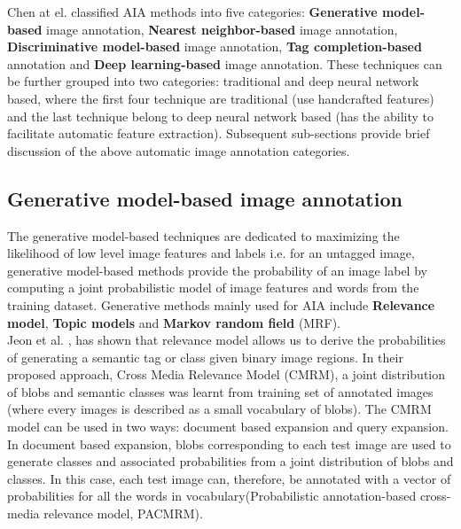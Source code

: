 \documentclass[conference]{IEEEtran}
\begin{document}
 	Chen at el. \cite{b2} classified AIA methods into five categories: \textbf{Generative model-based} image annotation, \textbf{Nearest neighbor-based}
image annotation, \textbf{Discriminative model-based} image annotation, \textbf{Tag completion-based}
annotation and \textbf{Deep learning-based} image annotation. These techniques can be further
grouped into two categories: traditional and deep neural network based, where the first
four technique are traditional (use handcrafted features) and the last technique belong to
deep neural network based (has the ability to facilitate automatic feature extraction). Subsequent sub-sections provide brief discussion of the above automatic
image annotation categories.

	\subsection{Generative model-based image annotation}
	
		The generative model-based techniques are dedicated to maximizing the likelihood of low
level image features and labels i.e. for an untagged image, generative model-based methods
provide the probability of an image label by computing a joint probabilistic model of image
features and words from the training dataset. Generative methods mainly used for AIA
include \textbf{Relevance model}, \textbf{Topic models} and \textbf{Markov random field} (MRF).\\
		
		Jeon et al. \cite{b3}, has shown that relevance model allows us to derive the probabilities of
generating a semantic tag or class given binary image regions. In their proposed approach,
Cross Media Relevance Model (CMRM), a joint distribution of blobs and semantic classes
was learnt from training set of annotated images (where every images is described as a
small vocabulary of blobs). The CMRM model can be used in two ways: document based
expansion and query expansion. In document based expansion, blobs corresponding
to each test image are used to generate classes and associated probabilities from a joint
distribution of blobs and classes. In this case, each test image can, therefore, be annotated
with a vector of probabilities for all the words in vocabulary(Probabilistic annotation-based
cross-media relevance model, PACMRM).\\ 
		
\end{document}

